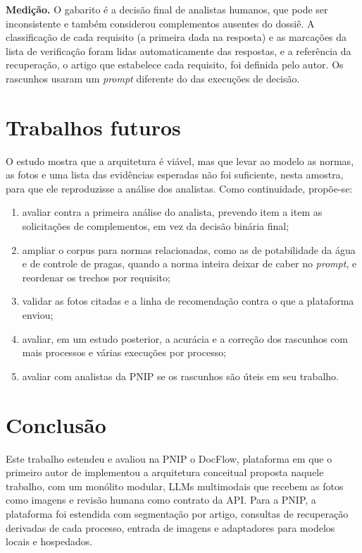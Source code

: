 \textbf{Medição.} O gabarito é a decisão final de analistas humanos, que pode ser inconsistente e também considerou complementos ausentes do dossiê. A classificação de cada requisito (a primeira dada na resposta) e as marcações da lista de verificação foram lidas automaticamente das respostas, e a referência da recuperação, o artigo que estabelece cada requisito, foi definida pelo autor. Os rascunhos usaram um \textit{prompt} diferente do das execuções de decisão.

\section{Trabalhos futuros}
\label{sec:trabalhos-futuros}

O estudo mostra que a arquitetura é viável, mas que levar ao modelo as normas, as fotos e uma lista das evidências esperadas não foi suficiente, nesta amostra, para que ele reproduzisse a análise dos analistas. Como continuidade, propõe-se:

\begin{enumerate}
	\item avaliar contra a primeira análise do analista, prevendo item a item as solicitações de complementos, em vez da decisão binária final;
	\item ampliar o corpus para normas relacionadas, como as de potabilidade da água e de controle de pragas, quando a norma inteira deixar de caber no \textit{prompt}, e reordenar os trechos por requisito;
	\item validar as fotos citadas e a linha de recomendação contra o que a plataforma enviou;
	\item avaliar, em um estudo posterior, a acurácia e a correção dos rascunhos com mais processos e várias execuções por processo;
	\item avaliar com analistas da PNIP se os rascunhos são úteis em seu trabalho.
\end{enumerate}

\section{Conclusão}
\label{sec:conclusao}

Este trabalho estendeu e avaliou na PNIP o DocFlow, plataforma em que o primeiro autor de  implementou a arquitetura conceitual proposta naquele trabalho, com um monólito modular, LLMs multimodais que recebem as fotos como imagens e revisão humana como contrato da API. Para a PNIP, a plataforma foi estendida com segmentação por artigo, consultas de recuperação derivadas de cada processo, entrada de imagens e adaptadores para modelos locais e hospedados.

